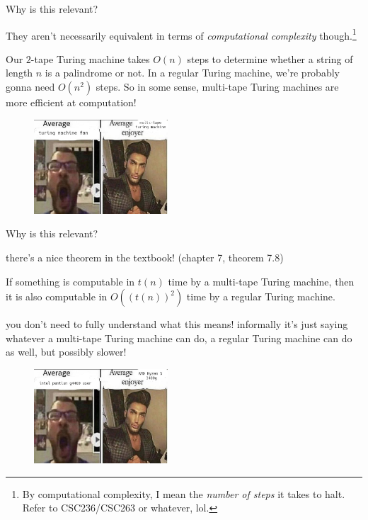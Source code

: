 \documentclass{beamer}
\begin{document}
\begin{frame}{Why is this relevant?}

\vspace{2mm}

They aren't necessarily equivalent in terms of \textit{computational complexity} though.\footnote{By computational complexity, I mean the \textit{number of steps} it takes to halt. Refer to CSC236/CSC263 or whatever, lol.}\\

\vspace{2mm}

Our $2$-tape Turing machine takes $O(n)$ steps to determine whether a string of length $n$ is a palindrome or not. In a regular Turing machine, we're probably gonna need $O(n^2)$ steps. So in some sense, multi-tape Turing machines are more efficient at computation!

\vspace{2mm}

\begin{figure}[h]
\centering
\includegraphics[width=5cm]{img/average.jpg}
\end{figure}


\end{frame}

\begin{frame}{Why is this relevant?}

there's a nice theorem in the textbook! (chapter 7, theorem 7.8)

\begin{theorem}[kinda]
If something is computable in $t(n)$ time by a multi-tape Turing machine, then it is also computable in $O((t(n))^2)$ time by a regular Turing machine.
\end{theorem}

you don't need to fully understand what this means! informally it's just saying whatever a multi-tape Turing machine can do, a regular Turing machine can do as well, but possibly slower!

\begin{figure}[h]
\centering
\includegraphics[width=5cm]{img/average2.jpg}
\end{figure}

\end{frame}
\end{document}
